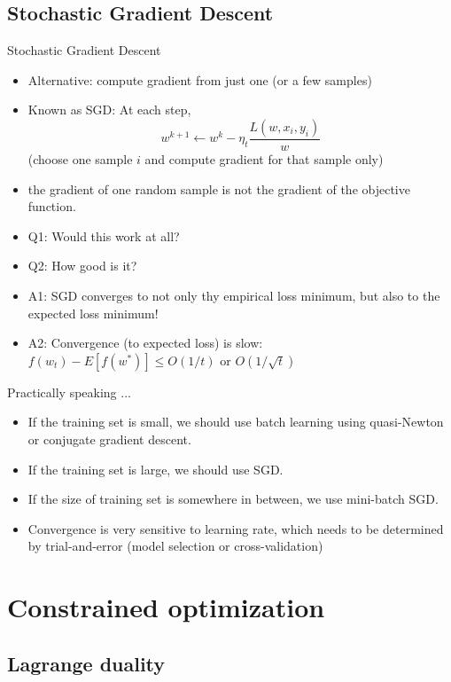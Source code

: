 \documentclass[draft]{beamer}
\begin{document}
\subsection{Stochastic Gradient Descent} 
\begin{frame}{Stochastic Gradient Descent} 
	\begin{itemize}
		\item Alternative: compute gradient from just one (or a few samples) 
		\item Known as SGD: At each step, 
		\[ w^{k+1} \leftarrow w^{k} - \eta_t \frac{L(w,x_i,y_i)}{w}  \] 
		(choose one sample $i$ and compute gradient for that sample only) 
		\item the gradient of one random sample is not the gradient of the objective function. 
		\item Q1: Would this work at all? 
		\item Q2: How good is it? 
		\item<2-> A1: SGD converges to not only thy empirical loss minimum, but also to the expected loss minimum! 
		\item<2-> A2: Convergence (to expected loss) is slow: $f(w_t) -E[f(w^*)] \le O(1/t) $ or $O(1/\sqrt{t}) $
	\end{itemize}
\end{frame}

\begin{frame}{Practically speaking ... }
	\begin{itemize}
		\item If the training set is small, we should use batch learning using quasi-Newton or conjugate gradient descent. 
		\item If the training set is large, we should use SGD. 
		\item If the size of training set is somewhere in between, we use mini-batch SGD. 
		\item Convergence is very sensitive to learning rate, which needs to be determined by trial-and-error (model selection or cross-validation) 
	\end{itemize}
\end{frame}
\section{Constrained optimization} 
\subsection{Lagrange duality} 
\end{document}

